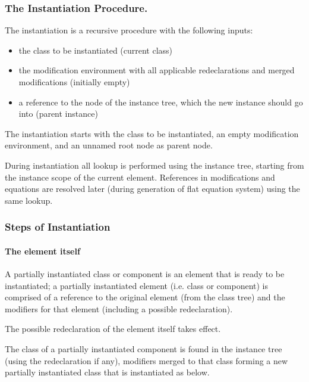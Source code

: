 \documentclass[10pt,a4paper]{report}
\def\doublelabel#1{\label{#1}}
\begin{document}
\subsubsection{The Instantiation Procedure.}\doublelabel{the-instantiation-procedure}

The instantiation is a recursive procedure with the following inputs:

\begin{itemize}
\item
  the class to be instantiated (current class)
\item
  the modification environment with all applicable redeclarations and
  merged modifications (initially empty)
\item
  a reference to the node of the instance tree, which the new instance
  should go into (parent instance)
\end{itemize}

The instantiation starts with the class to be instantiated, an empty
modification environment, and an unnamed root node as parent node.

During instantiation all lookup is performed using the instance tree,
starting from the instance scope of the current element. References in
modifications and equations are resolved later (during generation of
flat equation system) using the same lookup.

\subsubsection{Steps of Instantiation}\doublelabel{steps-of-instantiation}

\paragraph{The element itself}\doublelabel{the-element-itself}

A partially instantiated class or component is an element that is ready
to be instantiated; a partially instantiated element (i.e. class or
component) is comprised of a reference to the original element (from the
class tree) and the modifiers for that element (including a possible
redeclaration).

The possible redeclaration of the element itself takes effect.

The class of a partially instantiated component is found in the instance
tree (using the redeclaration if any), modifiers merged to that class
forming a new partially instantiated class that is instantiated as
below.
\end{document}
